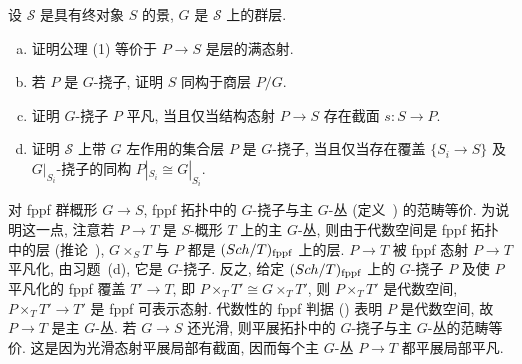 \begin{exercise}\label{src:7.4.4}
设 $\mathcal S$ 是具有终对象 $S$ 的景, $G$ 是 $\mathcal S$ 上的群层.
\begin{enumerate}[(a)]
\item 证明公理 (1) 等价于 $P\to S$ 是层的满态射.
\item 若 $P$ 是 $G$-挠子, 证明 $S$ 同构于商层 $P/G$.
\item 证明 $G$-挠子 $P$ 平凡, 当且仅当结构态射 $P\to S$ 存在截面 $s:S\to P$.
\item 证明 $\mathcal S$ 上带 $G$ 左作用的集合层 $P$ 是 $G$-挠子, 当且仅当存在覆盖 $\{S_i\to S\}$ 及 $G|_{S_i}$-挠子的同构 $P|_{S_i}\cong G|_{S_i}$.
\end{enumerate}
\end{exercise}
\begin{example}[主 \texorpdfstring{$G$}{G}-丛]\label{src:7.4.5}
对 fppf 群概形 $G\to S$, fppf 拓扑中的 $G$-挠子与主 $G$-丛 (定义~) 的范畴等价. 为说明这一点, 注意若 $P\to T$ 是 $S$-概形 $T$ 上的主 $G$-丛, 则由于代数空间是 fppf 拓扑中的层 (推论~), $G\times_S T$ 与 $P$ 都是 $(Sch/T)_{\mathrm{fppf}}$ 上的层. $P\to T$ 被 fppf 态射 $P\to T$ 平凡化, 由习题~(d), 它是 $G$-挠子. 反之, 给定 $(Sch/T)_{\mathrm{fppf}}$ 上的 $G$-挠子 $P$ 及使 $P$ 平凡化的 fppf 覆盖 $T'\to T$, 即 $P\times_T T'\cong G\times_T T'$, 则 $P\times_T T'$ 是代数空间, $P\times_T T'\to T'$ 是 fppf 可表示态射. 代数性的 fppf 判据 () 表明 $P$ 是代数空间, 故 $P\to T$ 是主 $G$-丛. 若 $G\to S$ 还光滑, 则平展拓扑中的 $G$-挠子与主 $G$-丛的范畴等价. 这是因为光滑态射平展局部有截面, 因而每个主 $G$-丛 $P\to T$ 都平展局部平凡.
\end{example}

